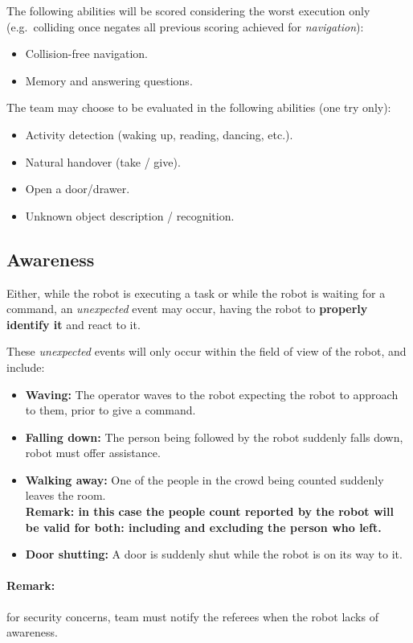 The following abilities will be scored considering the worst execution only (e.g.~colliding once negates all previous scoring achieved for \textit{navigation}):

\begin{itemize}
	\item Collision-free navigation.
	\item Memory and answering questions.
\end{itemize}


The team may choose to be evaluated in the following abilities (one try only):
\begin{itemize}
	\item Activity detection (waking up, reading, dancing, etc.).
	\item Natural handover (take / give).
	\item Open a door/drawer.
	\item Unknown object description / recognition.
\end{itemize}

\subsection{Awareness}
\label{sec:eegpsr-awarenes}
Either, while the robot is executing a task or while the robot is waiting for a command, an \textit{unexpected} event may occur, having the robot to \textbf{properly identify it} and react to it.

These \textit{unexpected} events will only occur within the field of view of the robot, and include:
\begin{itemize}
	\item \textbf{Waving:} The operator waves to the robot expecting the robot to approach to them, prior to give a command.
	\item \textbf{Falling down:} The person being followed by the robot suddenly falls down, robot must offer assistance.
	\item \textbf{Walking away:} One of the people in the crowd being counted suddenly leaves the room. \\ \textbf{Remark: in this case the people count reported by the robot will be valid for both: including and excluding the person who left.}
	\item \textbf{Door shutting:} A door is suddenly shut while the robot is on its way to it.
\end{itemize}

\paragraph*{Remark:} for security concerns, team must notify the referees when the robot lacks of awareness.

